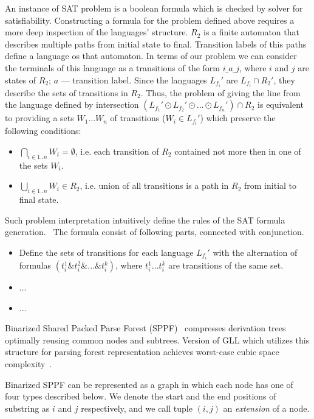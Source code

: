 An instance of SAT problem is a boolean formula which is checked by solver for satisfiability. 
Constructing a formula for the problem defined above requires a more deep inspection of the languages' structure.
$R_2$ is a finite automaton that describes multiple paths from initial state to final. Transition labels of 
this paths define a language os that automaton. In terms of our problem we can consider the terminals of this language as 
a transitions of the form $i\_a\_j$, where $i$ and $j$ are states of $R_2$; $a$ --- transition label.
Since the languages $L_{f_i}'$ are $L_{f_i} \cap R_2'$, they describe the sets of transitions in 
$R_2$. Thus, the problem of giving the line from the language defined by intersection $(L_{f_1}' \odot L_{f_2}' \odot... \odot L_{f_n}')\cap R_2$
is equivalent to providing a sets $W_1...W_n$ of transitions ($W_i \in L_{f_i}'$) which preserve the following conditions:
\begin{itemize}
    \item $\bigcap\limits_{i\in 1..n} W_i = \emptyset$, i.e.
    each transition of $R_2$ contained not more then in one of the sets $W_i$.
    \item $\bigcup\limits_{i\in 1..n} W_i \in R_2$, i.e. union of all transitions
    is a path in $R_2$ from initial to final state. 
\end{itemize}
Such problem interpretation intuitively define the rules of the SAT formula generation.~\cite{Grigorev}
The formula consist of following parts, connected with conjunction.
\begin{itemize}
    \item Define the sets of transitions for each language $L_{f_i}'$ with the alternation
     of formulas $(t_i^1 \& t_i^2 \& ...\& t_i^k)$, where $t_i^1 ... t_i^k$ are transitions of the same set.
    \item ...
    \item ...
\end{itemize}


Binarized Shared Packed Parse Forest (SPPF)~\cite{brnglr} compresses derivation trees optimally reusing common nodes and subtrees.
Version of GLL which utilizes this structure for parsing forest representation achieves worst-case cubic space complexity~\cite{gllParsingTree}.

Binarized SPPF can be represented as a graph in which each node has one of four types described below.
We denote the start and the end positions of substring as $i$ and $j$ respectively, and we call tuple $(i,j)$ an \textit{extension} of a node.

